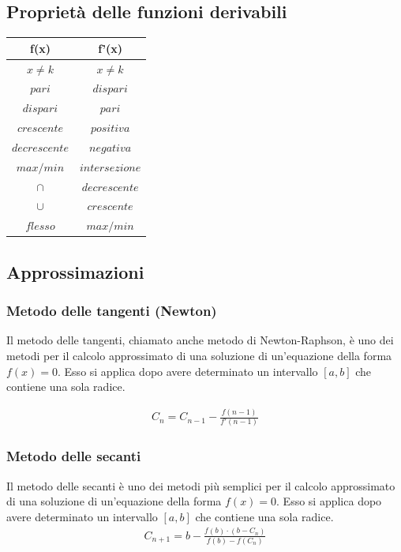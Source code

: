 \documentclass[a4paper]{article}
\begin{document}
	\subsection{Proprietà delle funzioni derivabili}
	\begin{center}
		\begin{tabular}{|c|c|}
		\hline 
		\textbf{f(x)} & \textbf{f'(x)} \\ 
		\hline 
		$x \ne k$ & $x \ne k$ \\ 
		\hline 
		$pari$ & $dispari$ \\ 
		\hline 
		$dispari$ & $pari$ \\ 
		\hline 
		$crescente$ & $positiva$ \\ 
		\hline 
		$decrescente$ & $negativa$ \\ 
		\hline 
		$max/min$ & $intersezione$ \\ 
		\hline
		$\cap$	&	$decrescente$ \\
		\hline
		$\cup$	&	$crescente$	\\
		\hline
		$flesso$ & $max/min$	\\
		\hline
		\end{tabular} 
	\end{center}
	
	\subsection{Approssimazioni}
	\subsubsection{Metodo delle tangenti (Newton)}
	Il metodo delle tangenti, chiamato anche metodo di Newton-Raphson, è uno dei metodi per il calcolo approssimato di una soluzione di un'equazione della forma $f(x)=0$. Esso si applica dopo avere determinato un intervallo $[a,b]$ che contiene una sola radice.
	
	\begin{align*}
		C_n = C_{n-1}-\frac{f(n-1)}{f'(n-1)}
	\end{align*}
	\subsubsection{Metodo delle secanti}
	Il metodo delle secanti è uno dei metodi più semplici per il calcolo approssimato di una soluzione di un'equazione della forma $f(x)=0$. Esso si applica dopo avere determinato un intervallo $[a,b]$ che contiene una sola radice.
	\begin{align*}
		C_{n+1} = b-\frac{f(b)\cdot (b-C_n)}{f(b)-f(C_n)}
	\end{align*}
	
\end{document}
